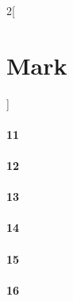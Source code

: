 \documentclass{book}
\begin{document}
\begin{multicols}{2}[\part{Mark}]
\subsection*{11}
\subsection*{12}
\subsection*{13}
\subsection*{14}
\subsection*{15}
\subsection*{16}
\end{multicols}
\end{document}
